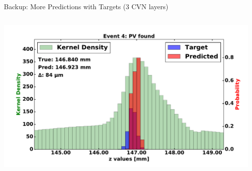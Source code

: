 \begin{frame}{Backup: More Predictions with Targets (3 CVN layers)}
\begin{columns}[c]
\begin{center}
           \includegraphics[width=1\textwidth, height=0.45\textwidth, trim=18 0 18 0]{images/120000_3layer_27.pdf}
       \end{center}
  \end{columns}
\end{frame}

